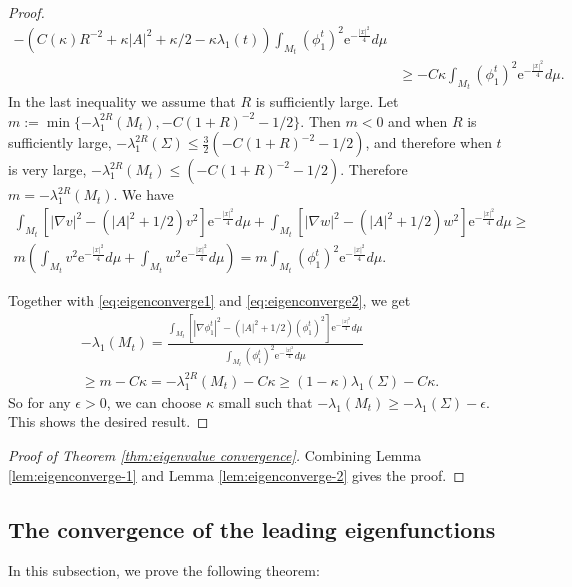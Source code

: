 \documentclass[12pt]{amsart}
\numberwithin{equation}{section}
\numberwithin{equation}{section}
\begin{document}
\begin{proof}
\begin{equation}
\begin{split}
				-(C(\kappa)R^{-2}+\kappa|A|^2+\kappa/2-\kappa\lambda_1(t))
				\int_{M_t}(\phi_1^t)^2\mathrm{e}^{-\frac{|x|^2}{4}}d\mu 
				\\
				&\geq 
				-C\kappa\int_{M_t}(\phi_1^t)^2\mathrm{e}^{-\frac{|x|^2}{4}}d\mu.
			\end{split}
		\end{equation}
		In the last inequality we assume that $R$ is sufficiently large.
		Let 
		$
		m:=\min\{-\lambda_1^{2R}(M_t),-C(1+R)^{-2}-1/2\}.
		$
		Then $m<0$ and when $R$ is sufficiently large, $-\lambda_1^{2R}(\Sigma)\leq\frac{3}{2}( -C(1+R)^{-2}-1/2)$, and therefore when $t$ is very large, $-\lambda_1^{2R}(M_t)\leq( -C(1+R)^{-2}-1/2)$. Therefore $m=-\lambda_1^{2R}(M_t)$. We have
		\begin{multline}\label{eq:eigenconverge2}
			\int_{M_t}[|\nabla v|^2 -(|A|^2+1/2)v^2]\mathrm{e}^{-\frac{|x|^2}{4}}d\mu
			+
			\int_{M_t}[|\nabla w|^2 -(|A|^2+1/2)w^2]\mathrm{e}^{-\frac{|x|^2}{4}}d\mu
			\geq
			\\ m\left(\int_{M_t}v^2\mathrm{e}^{-\frac{|x|^2}{4}}d\mu
			+
			\int_{M_t}w^2\mathrm{e}^{-\frac{|x|^2}{4}}d\mu
			\right)
			=m\int_{M_t}(\phi_1^t)^2\mathrm{e}^{-\frac{|x|^2}{4}}d\mu.
		\end{multline}
		
		Together with \eqref{eq:eigenconverge1} and \eqref{eq:eigenconverge2}, we get
		\begin{multline*}
			-\lambda_1(M_t)=
			\frac{\int_{M_t}[|\nabla \phi_1^t|^2 -(|A|^2+1/2)(\phi_1^t)^2]\mathrm{e}^{-\frac{|x|^2}{4}}d\mu}
			{\int_{M_t}(\phi_1^t)^2\mathrm{e}^{-\frac{|x|^2}{4}}d\mu}
			\\
			\geq m-C\kappa=-\lambda_1^{2R}(M_t)-C\kappa
			\geq (1-\kappa)\lambda_1(\Sigma)-C\kappa.
		\end{multline*}
		So for any $\epsilon>0$, we can choose $\kappa$ small such that $-\lambda_1(M_t)\geq -\lambda_1(\Sigma)-\epsilon$. This shows the desired result.
	\end{proof}
	
	
	\begin{proof}[Proof of Theorem \ref{thm:eigenvalue convergence}]
		Combining Lemma \ref{lem:eigenconverge-1} and Lemma \ref{lem:eigenconverge-2} gives the proof.
	\end{proof}
	
	\subsection{The convergence of the leading eigenfunctions} \label{SSConvergeFunction}In this subsection, we prove the following theorem:
	
\end{document}
